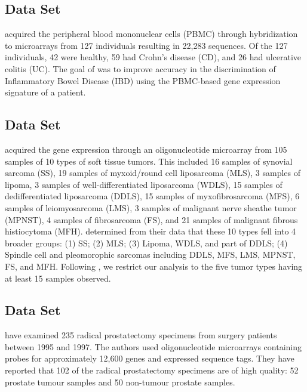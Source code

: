 \documentclass[11pt]{article}
\begin{document}
\subsection{\cite{Burczynski:2006ik} Data Set}

\cite{Burczynski:2006ik} acquired the peripheral blood mononuclear cells (PBMC) through hybridization to microarrays from 127 individuals resulting in 22,283 sequences. Of the 127 individuals, 42 were healthy, 59 had Crohn's disease (CD), and 26 had ulcerative colitis (UC). The goal of \cite{Burczynski:2006ik} was to improve accuracy in the discrimination of Inflammatory Bowel Disease (IBD) using the PBMC-based gene expression signature of a patient.

\subsection{\cite{Nakayama:2007fl} Data Set}

\cite{Nakayama:2007fl} acquired the gene expression through an oligonucleotide microarray from 105 samples of 10 types of soft tissue tumors. This included 16 samples of synovial sarcoma (SS), 19 samples of myxoid/round cell liposarcoma (MLS), 3 samples of lipoma, 3 samples of well-differentiated liposarcoma (WDLS), 15 samples of dedifferentiated liposarcoma (DDLS), 15 samples of myxofibrosarcoma (MFS), 6 samples of leiomyosarcoma (LMS), 3 samples of malignant nerve sheathe tumor (MPNST), 4 samples of fibrosarcoma (FS), and 21 samples of malignant fibrous histiocytoma (MFH). \cite{Nakayama:2007fl} determined from their data that these 10 types fell into 4 broader groups: (1) SS; (2) MLS; (3) Lipoma, WDLS, and part of DDLS; (4) Spindle cell and pleomorophic sarcomas including DDLS, MFS, LMS, MPNST, FS, and MFH. Following \cite{Witten:2011kc}, we restrict our analysis to the five tumor types having at least 15 samples observed.

\subsection{\cite{Singh:2002fh} Data Set}

\cite{Singh:2002fh} have examined 235 radical prostatectomy specimens from surgery patients between 1995 and 1997. The authors used oligonucleotide microarrays containing probes for approximately 12,600 genes and expressed sequence tags. They have reported that 102 of the radical prostatectomy specimens are of high quality: 52 prostate tumour samples and 50 non-tumour prostate samples.
\end{document}
